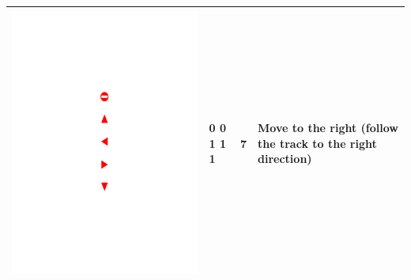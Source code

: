 \begin{table}[!h]
\begin{tabular}{|c|C{2cm}|C{2cm}|C{5cm}|}
		\begin{minipage}{.075\textwidth}\includegraphics[scale=.5,trim=9.1cm 10.75cm 9.5cm 15.75cm,clip]{signs.pdf}\end{minipage}	& 0 0 1 1 1 & 7 & Move to the right (follow the track to the right direction) \\ \hline

\end{tabular}
\end{table}
